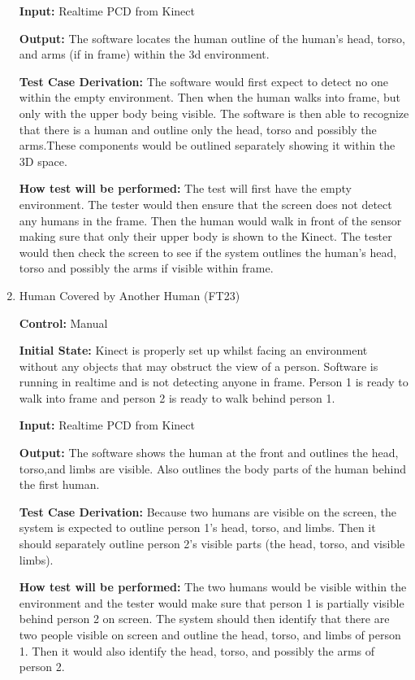 \documentclass[12pt, titlepage]{article}
\begin{document}
\begin{enumerate}
  \textbf{Input:} Realtime PCD from Kinect
  
  \textbf{Output:} The software locates the human outline of the human’s head, torso, and arms (if in frame) within the 3d environment. 
  
  \textbf{Test Case Derivation:} The software would first expect to detect no one within the empty environment. Then when the human walks into frame, but only with the upper body being visible. The software is then able to recognize that there is a human and outline only the head, torso and possibly the arms.These components would be outlined separately showing it within the 3D space.
  
  \textbf{How test will be performed:} The test will first have the empty  environment. The tester would then ensure that the screen does not detect any humans in the frame. Then the human would walk in front of the sensor making sure that only their upper body is shown to the Kinect. The tester would then check the screen to see if  the system outlines the human’s head, torso and possibly the arms if visible within frame.
  
  \item{Human Covered by Another Human (FT23)\\}
  
  \textbf{Control:} Manual

  \textbf{Initial State:} Kinect is properly set up whilst facing an environment without any objects that may obstruct the view of a person. Software is running in realtime and is not detecting anyone in frame. Person 1  is ready to walk into frame and person 2 is ready to walk behind person 1.
  
  \textbf{Input:} Realtime PCD from Kinect

  \textbf{Output:} The software shows the human at the front and outlines the head, torso,and limbs are visible. Also outlines the body parts of the human behind the first human. 

  \textbf{Test Case Derivation:} Because two humans are visible on the screen, the system is expected to outline person 1’s head, torso, and limbs. Then it should separately outline person 2’s visible parts (the head, torso, and visible limbs).

  \textbf{How test will be performed:} The two humans would be visible within the environment and the tester would make sure that person 1 is partially visible behind person 2 on screen. The system should then identify that there are two people visible on screen and outline the head, torso, and limbs of person 1. Then it would also identify the head, torso, and possibly the arms of person 2. 


\end{enumerate}
\end{document}
